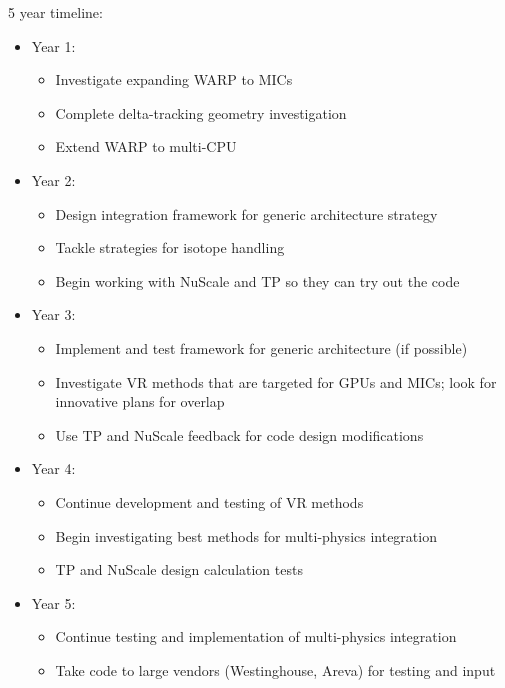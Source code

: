 \documentclass{proposalnsf}
\begin{document}
5 year timeline:
\begin{itemize}
\item Year 1:
    \begin{itemize}
    \item Investigate expanding WARP to MICs
    \item Complete delta-tracking geometry investigation
    \item Extend WARP to multi-CPU
    \end{itemize}

\item Year 2:
    \begin{itemize}
    \item Design integration framework for generic architecture strategy
    \item Tackle strategies for isotope handling
    \item Begin working with NuScale and TP so they can try out the code
    \end{itemize}

\item Year 3:
    \begin{itemize}
    \item Implement and test framework for generic architecture (if possible)
    \item Investigate VR methods that are targeted for GPUs and MICs; look for
          innovative plans for overlap
    \item Use TP and NuScale feedback for code design modifications
    \end{itemize}

\item Year 4:
    \begin{itemize}
    \item Continue development and testing of VR methods
    \item Begin investigating best methods for multi-physics integration
    \item TP and NuScale design calculation tests
    \end{itemize}

\item Year 5:
    \begin{itemize}
    \item Continue testing and implementation of multi-physics integration
    \item Take code to large vendors (Westinghouse, Areva) for testing and input
    \end{itemize}
\end{itemize}
\end{document}
